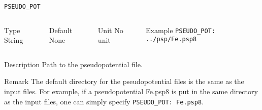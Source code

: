 \documentclass[xcolor=dvipsnames,t]{beamer}
\begin{document}
\begin{frame}[allowframebreaks]{\texttt{PSEUDO\_POT}} \label{PSEUDO_POT}
\vspace*{-12pt}
\begin{columns}
\begin{block}{Type}
String
\end{block}

\begin{block}{Default}
None
\end{block}

\begin{block}{Unit}
No unit
\end{block}

\begin{block}{Example}
\texttt{PSEUDO\_POT: ../psp/Fe.psp8}  
\end{block}
\end{columns}

\begin{block}{Description}
Path to the pseudopotential file. 
\end{block}

\begin{block}{Remark}
The default directory for the pseudopotential files is the same as the input files. For example, if a pseudopotential Fe.psp8 is put in the same directory as the input files, one can simply specify \texttt{PSEUDO\_POT: Fe.psp8}. 
\end{block}

\end{frame}
\end{document}
